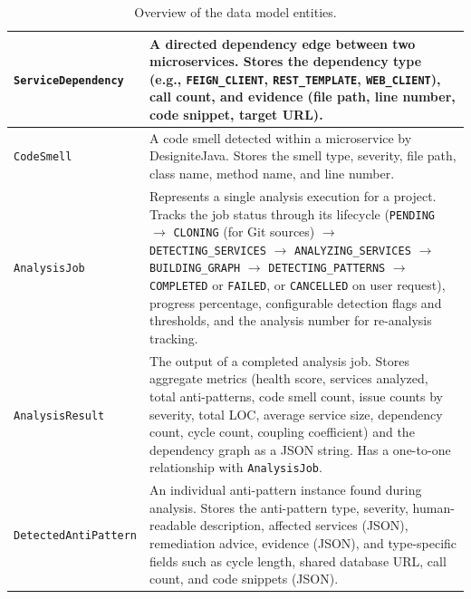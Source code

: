 \begin{table}[htbp]
\begin{tabular}{|l|p{9cm}|}
        \hline
        \texttt{ServiceDependency}   & A directed dependency edge between two microservices. Stores the dependency type (e.g., \texttt{FEIGN\_CLIENT}, \texttt{REST\_TEMPLATE}, \texttt{WEB\_CLIENT}), call count, and evidence (file path, line number, code snippet, target URL).                                                                                                                                                                                  \\
        \hline
        \texttt{CodeSmell}           & A code smell detected within a microservice by DesigniteJava. Stores the smell type, severity, file path, class name, method name, and line number.                                                                                                                                                                                                                                                                           \\
        \hline
        \texttt{AnalysisJob}         & Represents a single analysis execution for a project. Tracks the job status through its lifecycle (\texttt{PENDING} $\to$ \texttt{CLONING} (for Git sources) $\to$ \texttt{DETECTING\_SERVICES} $\to$ \texttt{ANALYZING\_SERVICES} $\to$ \texttt{BUILDING\_GRAPH} $\to$ \texttt{DETECTING\_PATTERNS} $\to$ \texttt{COMPLETED} or \texttt{FAILED}, or \texttt{CANCELLED} on user request), progress percentage, configurable detection flags and thresholds, and the analysis number for re-analysis tracking. \\
        \hline
        \texttt{AnalysisResult}      & The output of a completed analysis job. Stores aggregate metrics (health score, services analyzed, total anti-patterns, code smell count, issue counts by severity, total LOC, average service size, dependency count, cycle count, coupling coefficient) and the dependency graph as a JSON string. Has a one-to-one relationship with \texttt{AnalysisJob}.                                                                 \\
        \hline
        \texttt{DetectedAntiPattern} & An individual anti-pattern instance found during analysis. Stores the anti-pattern type, severity, human-readable description, affected services (JSON), remediation advice, evidence (JSON), and type-specific fields such as cycle length, shared database URL, call count, and code snippets (JSON).                                                                                                                       \\
        \hline
    \end{tabular}
    \caption{Overview of the data model entities.}
    \label{tab:entities}
\end{table}

